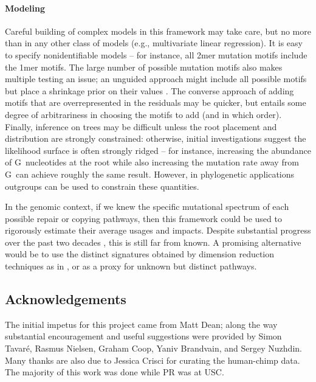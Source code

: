 \documentclass{article}
\newcommand{\nG}{\mbox{G}}
\theoremstyle{plain}
\theoremstyle{definition}
\begin{document}
\paragraph{Modeling}
Careful building of complex models in this framework may take care,
but no more than in any other class of models (e.g., multivariate linear regression).
It is easy to specify nonidentifiable models --
for instance, all 2mer mutation motifs include the 1mer motifs.
The large number of possible mutation motifs also makes multiple testing an issue;
an unguided approach might include all possible motifs but place a shrinkage prior on their values \citep{bhadra2015horseshoe}.
The converse approach of adding motifs that are overrepresented in the residuals
may be quicker, but entails some degree of arbitrariness in choosing the motifs to add (and in which order).
Finally, inference on trees may be difficult unless the root placement and distribution are strongly constrained:
otherwise, initial investigations suggest the likelihood surface is often strongly ridged --
for instance, increasing the abundance of \nG\ nucleotides at the root while also increasing the mutation rate away from \nG\
can achieve roughly the same result.
However, in phylogenetic applications outgroups can be used to constrain these quantities.

In the genomic context,
if we knew the specific mutational spectrum of each possible repair or copying pathways,
then this framework could be used to rigorously estimate their average usages and impacts.
Despite substantial progress over the past two decades \citep{goodman2013translesion,sale2012yfamily},
this is still far from known.
A promising alternative would be to use the distinct signatures obtained by dimension reduction techniques as in
\citet{alexandrov2013signatures}, \citep{mathieson2017differences} or \citep{shiraishi2015simple} as a proxy for unknown but distinct pathways.



\subsection{Acknowledgements}
The initial impetus for this project came from Matt Dean;
along the way substantial encouragement and useful suggestions were provided by
Simon Tavar\'e, Rasmus Nielsen, Graham Coop, Yaniv Brandvain, and Sergey Nuzhdin.
Many thanks are also due to Jessica Crisci for curating the human-chimp data.
The majority of this work was done while PR was at USC.
\end{document}
